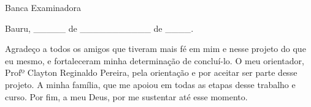 \documentclass[
  12pt,       %
  openright,      %
  oneside,      %
  a4paper,      %
  english,      %
  french,       %
  spanish,      %
  brazil,       %
  ]{abntex2}
\begin{document}

\frenchspacing 



\imprimircapa

\imprimirfolhaderosto*

\begin{folhadeaprovacao}
  \begin{center}
    {\ABNTEXchapterfont\large\imprimirautor}
    \vspace*{\fill}\vspace*{\fill}
    \begin{center}
      \ABNTEXchapterfont\bfseries\Large\imprimirtitulo
    \end{center}
    \vspace*{\fill}
    \hspace{.45\textwidth}
    \begin{minipage}{.5\textwidth}
        \imprimirpreambulo
    \end{minipage}%
    \vspace*{\fill}
  \end{center}
  \center Banca Examinadora
  \begin{center}
    \vspace*{0.5cm}
    \par
    {Bauru, \_\_\_\_\_ de \_\_\_\_\_\_\_\_\_\_\_ de \_\_\_\_.}
    \vspace*{1cm}
  \end{center}
\end{folhadeaprovacao}

\begin{agradecimentos}
Agradeço a todos os amigos que tiveram mais fé em mim e nesse projeto do que eu mesmo, e fortaleceram minha determinação de concluí-lo. O meu orientador, Profº Clayton Reginaldo Pereira, pela orientação e por aceitar ser parte desse projeto. A minha família, que me apoiou em todas as etapas desse trabalho e curso. Por fim, a meu Deus, por me sustentar até esse momento.
\end{agradecimentos}
\end{document}
